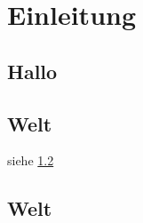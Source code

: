 \chapter{Einleitung}
\section{Hallo}\label{sec:hallo}

\blindtext[20]


\section{Welt}\label{sec:hallo}


siehe \ref{sec:hallo}


\blindtext[20]


\section{Welt}

\blindtext[20]
